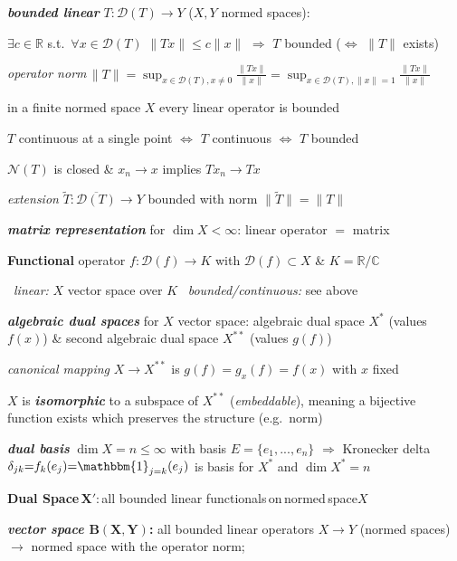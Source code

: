 \documentclass[8pt,twoside]{extarticle}
\begin{document}
\begin{multicols}{2}
\textit{\textbf{bounded linear}} $T:\mathscr{D}(T)\to Y$ ($X, Y$ normed spaces): 

$\exists c\in \mathbb{R}$ s.t.\ $\forall x\in\mathscr{D}(T)$ $\|Tx\|\leq c\|x\|$ $\Rightarrow$ $T$ bounded ($\Leftrightarrow$ $\|T\|$ exists)

\textit{operator norm}$\,\|T\|{=}\sup_{x\in\mathscr{D}(T), x\neq0}\!\!\frac{\|Tx\|}{\|x\|}{=}\sup_{x\in\mathscr{D}(T), \|x\|=1}\!\!\frac{\|Tx\|}{\|x\|} $

in a finite normed space $X$ every linear operator is bounded

$T$ continuous at a single point $\Leftrightarrow$ $T$ continuous $\Leftrightarrow$ $T$ bounded

$\mathscr{N}(T)$ is closed \& $x_n\to x$ implies $Tx_n\to Tx$

\textit{extension} $\tilde{T}: \overline{\mathscr{D}(T)}\to Y$ bounded  with norm $\|\tilde{T}\|=\|T\|$

\textit{\textbf{matrix representation}}  for $\dim X{<}\infty$: 
linear operator $\overset{~}{=}$ matrix

\textbf{Functional} operator $f:\mathscr{D}(f)\to K$ with $\mathscr{D}(f){\subset} X$ \& $K{=}\mathbb{R}/\mathbb{C}$

\textbullet \ \textit{linear:} $X$ vector space over $K$ \textbullet \ \textit{bounded/continuous:} see above

\textbf{\textit{algebraic dual spaces}} for $X$ vector space: algebraic dual space $X^*$ (values $f(x)$) \& second algebraic dual space $X^{**}$ (values $g(f)$)

\textit{canonical mapping} $X{\to} X^{**}$ is $g(f){=}g_x(f){=}f(x)$ with $x$ fixed

$X$ is \textit{\textbf{isomorphic}} to a subspace of $X^{**}$ (\textit{embeddable}), meaning a bijective function exists which preserves the structure (e.g.\ norm)

\textit{\textbf{dual basis}} $\dim X{=}n\leq \infty$ with basis $E{=}\{e_1,...,e_n\}$ $\Rightarrow$ Kronecker delta $\delta_{jk}{=}f_k(e_j){=}\mathbbm{1}_{j=k}(e_j)$ is basis for $X^*$ and $\dim X^*{=}n$

\textbf{Dual Space}\,$\boldsymbol{X'}$:\,all bounded linear functionals\,on\,normed\,space\hspace{0.1em}$X$

\textbf{\textit{vector space $\boldsymbol{B(X,Y)}$}:} all bounded linear operators $X\to Y$ (normed spaces) $\rightarrow$ normed space with the operator norm; 


\end{multicols}
\end{document}
